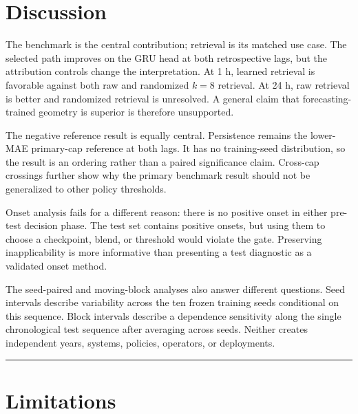 \documentclass{ieeeaccess}
\begin{document}
\section{Discussion}\label{discussion}

The benchmark is the central contribution; retrieval is its matched use case. The selected path improves on the GRU head at both retrospective lags, but the attribution controls change the interpretation. At 1 h, learned retrieval is favorable against both raw and randomized \(k=8\) retrieval. At 24 h, raw retrieval is better and randomized retrieval is unresolved. A general claim that forecasting-trained geometry is superior is therefore unsupported.

The negative reference result is equally central. Persistence remains the lower-MAE primary-cap reference at both lags. It has no training-seed distribution, so the result is an ordering rather than a paired significance claim. Cross-cap crossings further show why the primary benchmark result should not be generalized to other policy thresholds.

Onset analysis fails for a different reason: there is no positive onset in either pre-test decision phase. The test set contains positive onsets, but using them to choose a checkpoint, blend, or threshold would violate the gate. Preserving inapplicability is more informative than presenting a test diagnostic as a validated onset method.

The seed-paired and moving-block analyses also answer different questions. Seed intervals describe variability across the ten frozen training seeds conditional on this sequence. Block intervals describe a dependence sensitivity along the single chronological test sequence after averaging across seeds. Neither creates independent years, systems, policies, operators, or deployments.

\begin{center}\rule{0.5\linewidth}{0.5pt}\end{center}

\section{Limitations}\label{limitations}
\end{document}
